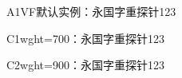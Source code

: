 \documentclass[fontset=none]{ctexart}
\begin{document}
\fontsize{22pt}{36pt}\selectfont
A1VF默认实例：永国字重探针123

C1wght=700：{\vfW 永国字重探针123}

C2wght=900：{\vfWx 永国字重探针123}
\end{document}
